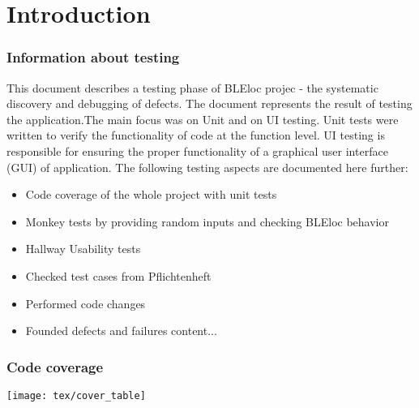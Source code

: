 \chapter{Introduction}
\subsection{Information about testing}
This document describes a testing phase of BLEloc projec - the systematic discovery and debugging of defects. The document represents the result of testing the application.The main focus was on Unit and on UI testing. Unit tests were written to verify the functionality of code at the function level. UI testing is responsible for ensuring the proper functionality of a graphical user interface (GUI) of application.
The following testing aspects are documented here further:
\begin{itemize}
	\item Code coverage of the whole project with unit tests
	\item Monkey tests by providing random inputs and checking BLEloc behavior 
	\item Hallway Usability tests  
	\item Checked test cases from Pflichtenheft
	\item Performed code changes 
	\item Founded defects and failures 
	content...
\end{itemize}

\subsection{Code coverage}
	\centering
	\texttt{[image: tex/cover\_table]}
